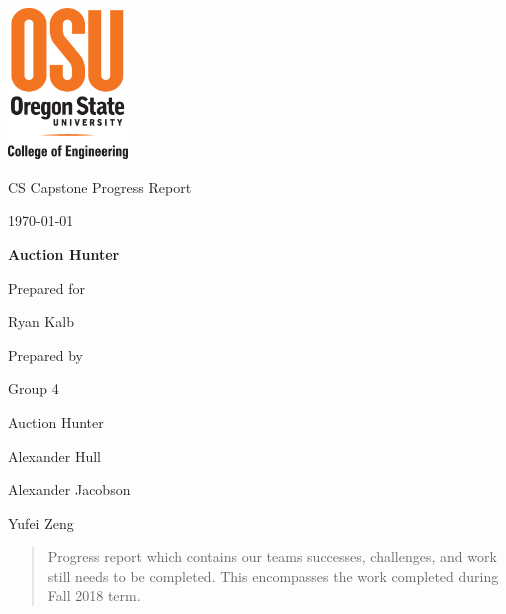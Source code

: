 \documentclass[onecolumn, draftclsnofoot,10pt, compsoc]{IEEEtran}
\def \CapstoneTeamName{		Auction Hunter}
\def \CapstoneTeamNumber{		4}
\def \GroupMemberOne{			Alexander Hull}
\def \GroupMemberTwo{			Alexander Jacobson}
\def \GroupMemberThree{			Yufei Zeng}
\def \CapstoneProjectName{		Auction Hunter}
\def \CapstoneSponsorCompany{	}
\def \CapstoneSponsorPerson{		Ryan Kalb}
\def \DocType{		%
				Progress Report
				}
\newcommand{\NameSigPair}[1]{\par
\makebox[2.75in][r]{#1} \hfil 	\makebox[3.25in]{\makebox[2.25in]{\hrulefill} \hfill		\makebox[.75in]{\hrulefill}}
\par\vspace{-12pt} \textit{\tiny\noindent
\makebox[2.75in]{} \hfil		\makebox[3.25in]{\makebox[2.25in][r]{Signature} \hfill	\makebox[.75in][r]{Date}}}}
\renewcommand{\NameSigPair}[1]{#1}
\begin{document}
\begin{titlepage}
    \begin{singlespace}
    	\includegraphics[height=4cm]{coe_v_spot1}
        \hfill 
        \par\vspace{.2in}
        \centering
        \scshape{
            \huge CS Capstone \DocType \par
            {\large\today}\par
            \vspace{.5in}
            \textbf{\Huge\CapstoneProjectName}\par
            \vfill
            {\large Prepared for}\par
            \Huge \CapstoneSponsorCompany\par
            \vspace{5pt}
            {\Large\NameSigPair{\CapstoneSponsorPerson}\par}
            {\large Prepared by }\par
            Group\CapstoneTeamNumber\par
            \CapstoneTeamName\par 
            \vspace{5pt}
            {\Large
                \NameSigPair{\GroupMemberOne}\par
                \NameSigPair{\GroupMemberTwo}\par
                \NameSigPair{\GroupMemberThree}\par
            }
            \vspace{20pt}
        }
        \begin{abstract}
        	Progress report which contains our teams successes, challenges, and work still needs to be completed. This encompasses the work completed during Fall 2018 term. 
        \end{abstract}     
    \end{singlespace}
\end{titlepage}
\newpage
{}
\tableofcontents
\clearpage
\end{document}
